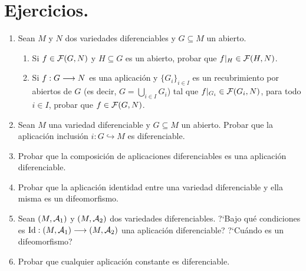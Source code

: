 \documentclass[cursovd_portada.tex]{subfiles}
\begin{document}
\section{Ejercicios.}
\begin{enumerate}
\item Sean $M$ y $N$ dos variedades diferenciables y $G\subseteq M$ un abierto.
\begin{enumerate}
\item Si $f\in{\cal F}(G,N)$ y $H\subseteq G$ es un abierto, probar que $f|_H\in{\cal F}(H,N)$.
\item Si $f:G\longrightarrow N$ es una aplicaci\'{o}n y $\{G_i\}_{i\in I}$ es un recubrimiento por abiertos de $G$ (es decir,
$G=\bigcup_{i\in I}G_i$) tal que $f|_{G_i}\in{\cal F}(G_i,N)$, para todo $i\in I$, probar que $f\in{\cal F}(G,N)$.
\end{enumerate}
\item Sean $M$ una variedad diferenciable y $G\subseteq M$ un
abierto. Probar que la aplicaci\'{o}n inclusi\'{o}n
$i:G\hookrightarrow M$ es diferenciable. \item Probar que la
composici\'{o}n de aplicaciones diferenciables es una
aplicaci\'{o}n diferenciable. \item Probar que la aplicaci\'{o}n
identidad entre una variedad diferenciable y ella misma es un
difeomorfismo. \item Sean $(M,{\cal A}_1)$ y $(M,{\cal A}_2)$ dos
variedades diferenciables. ?`Bajo qu\'{e} condiciones es ${\rm
Id}: (M,{\cal A}_1)\longrightarrow (M,{\cal A}_2)$ una aplicaci\'{o}n
diferenciable? ?`Cu\'{a}ndo es un difeomorfismo? \item Probar que
cualquier aplicaci\'{o}n constante es diferenciable. %
\end{enumerate}
\end{document}

